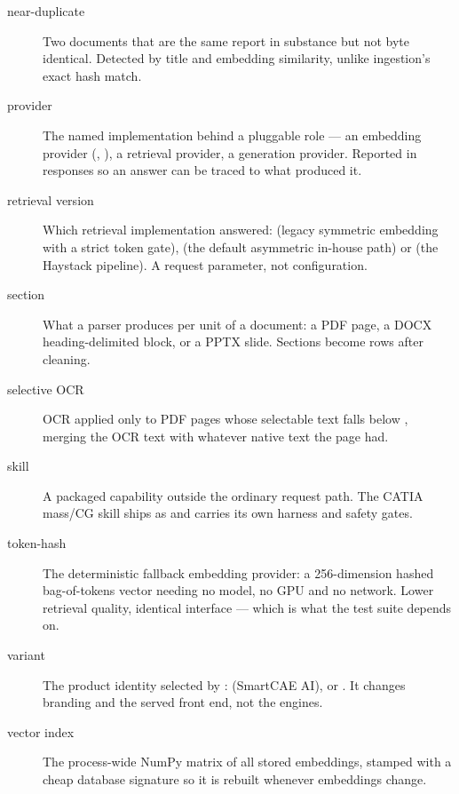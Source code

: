 \begin{description}
\item[near-duplicate] Two documents that are the same report in substance but not
byte identical. Detected by title and embedding similarity, unlike ingestion's
exact hash match.

\item[provider] The named implementation behind a pluggable role --- an embedding
provider (, ), a
retrieval provider, a generation provider. Reported in responses so an answer
can be traced to what produced it.

\item[retrieval version] Which retrieval implementation answered: 
(legacy symmetric embedding with a strict token gate),  (the default
asymmetric in-house path) or  (the Haystack pipeline). A request
parameter, not configuration.

\item[section] What a parser produces per unit of a document: a PDF page, a DOCX
heading-delimited block, or a PPTX slide. Sections become
 rows after cleaning.

\item[selective OCR] OCR applied only to PDF pages whose selectable text falls
below , merging the OCR text with whatever native
text the page had.

\item[skill] A packaged capability outside the ordinary request path. The CATIA
mass/CG skill ships as  and carries its own
harness and safety gates.

\item[token-hash] The deterministic fallback embedding provider: a
256-dimension hashed bag-of-tokens vector needing no model, no GPU and no
network. Lower retrieval quality, identical interface --- which is what the test
suite depends on.

\item[variant] The product identity selected by :
 (SmartCAE AI),  or . It changes
branding and the served front end, not the engines.

\item[vector index] The process-wide NumPy matrix of all stored embeddings,
stamped with a cheap database signature so it is rebuilt whenever embeddings
change.

\end{description}
